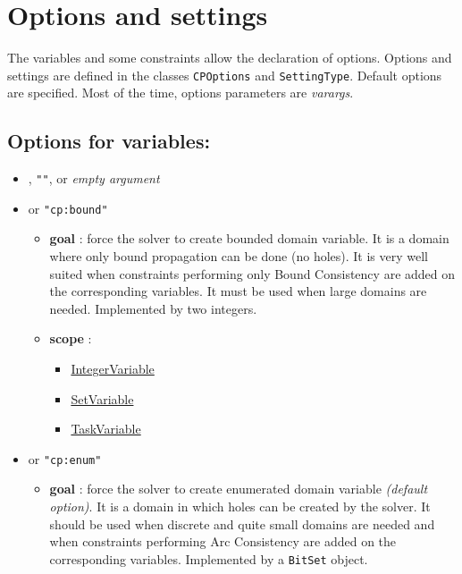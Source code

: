 \section{Options and settings}\label{optionssettings}\hypertarget{optionssettings}{}
The variables and some constraints allow the declaration of options. Options and settings are defined in the classes \texttt{CPOptions} and \texttt{SettingType}. Default options are specified. Most of the time, options parameters are \textit{varargs}.

\subsection{Options for variables:}
	\begin{itemize}
		\item {}, \texttt{""}, or \textit{empty argument}
		\item \label{vbound:vboundoptions}\hypertarget{vbound:vboundoptions}{}
		 or \texttt{"cp:bound"}
		\begin{itemize}
				\item \textbf{goal} : force the solver to create bounded domain variable. It is a domain where only bound propagation can be done (no holes). It is very well suited when constraints performing only Bound Consistency are added on the corresponding variables. It must be used when large domains are needed. Implemented by two integers.
				\item \textbf{scope} : 
					\begin{itemize} 
						\item \hyperlink{integervariable}{IntegerVariable}
						\item \hyperlink{setvariable}{SetVariable}
						\item  \hyperlink{taskvariable}{TaskVariable}
					\end{itemize}
		\end{itemize}				
		\item \label{venum:venumoptions}\hypertarget{venum:venumoptions}{}
		 or \texttt{"cp:enum"}
		\begin{itemize}
				\item \textbf{goal} : force the solver to create enumerated domain variable \textit{(default option)}. It is a domain in which holes can be created by the solver. It should be used when discrete and quite small domains are needed and when constraints performing Arc Consistency are added on the corresponding variables. Implemented by a \texttt{BitSet} object.

\end{itemize}
\end{itemize}
